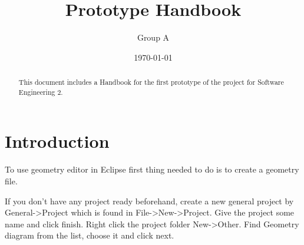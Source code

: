 \documentclass[11pt]{article}   %
\title{Prototype Handbook\\ \epns}
\author{Group A}
\date{\today}
\begin{document}
\maketitle

\begin{abstract}
This document includes a Handbook for the first prototype of the project for Software Engineering 2.
\end{abstract}

\tableofcontents \newpage

\section{Introduction}




To use geometry editor in Eclipse first thing needed to do is to create a geometry file. 

If you don’t have any project ready beforehand, create a new general project by General->Project which is found in File->New->Project. Give the project some name and click finish. 
Right click the project folder New->Other. Find Geometry diagram from the list, choose it and click next.


\printindex
\end{document}
